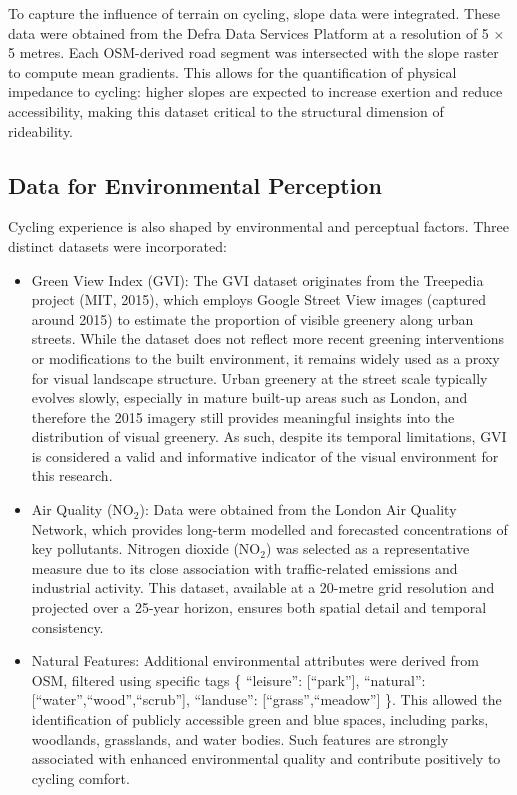\documentclass[
  12pt,
  oneside]{book}
\begin{document}
To capture the influence of terrain on cycling, slope data were integrated. These data were obtained from the Defra Data Services Platform at a resolution of 5 × 5 metres. Each OSM-derived road segment was intersected with the slope raster to compute mean gradients. This allows for the quantification of physical impedance to cycling: higher slopes are expected to increase exertion and reduce accessibility, making this dataset critical to the structural dimension of rideability.

\subsection{Data for Environmental Perception}\label{data-for-environmental-perception}

Cycling experience is also shaped by environmental and perceptual factors. Three distinct datasets were incorporated:

\begin{itemize}
\item
  Green View Index (GVI): The GVI dataset originates from the Treepedia project (MIT, 2015), which employs Google Street View images (captured around 2015) to estimate the proportion of visible greenery along urban streets. While the dataset does not reflect more recent greening interventions or modifications to the built environment, it remains widely used as a proxy for visual landscape structure. Urban greenery at the street scale typically evolves slowly, especially in mature built-up areas such as London, and therefore the 2015 imagery still provides meaningful insights into the distribution of visual greenery. As such, despite its temporal limitations, GVI is considered a valid and informative indicator of the visual environment for this research.
\item
  Air Quality (NO\(_2\)): Data were obtained from the London Air Quality Network, which provides long-term modelled and forecasted concentrations of key pollutants. Nitrogen dioxide (NO\(_2\)) was selected as a representative measure due to its close association with traffic-related emissions and industrial activity. This dataset, available at a 20-metre grid resolution and projected over a 25-year horizon, ensures both spatial detail and temporal consistency.
\item
  Natural Features: Additional environmental attributes were derived from OSM, filtered using specific tags \{ ``leisure'': {[}``park''{]}, ``natural'': {[}``water'',``wood'',``scrub''{]}, ``landuse'': {[}``grass'',``meadow''{]} \}. This allowed the identification of publicly accessible green and blue spaces, including parks, woodlands, grasslands, and water bodies. Such features are strongly associated with enhanced environmental quality and contribute positively to cycling comfort.
\end{itemize}
\end{document}
